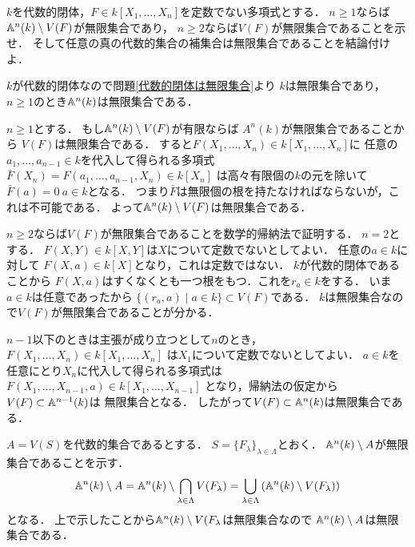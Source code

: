 \begin{prob}
  $k$を代数的閉体，$F\in k[X_1,\dots,X_n]$を定数でない多項式とする．
  $n\ge 1$ならば$\mathbb{A}^n(k) \setminus V(F)$が無限集合であり，
  $n\ge 2$ならば$V(F)$が無限集合であることを示せ．
  そして任意の真の代数的集合の補集合は無限集合であることを結論付けよ．
\end{prob}
\begin{ans}
  $k$が代数的閉体なので問題\ref{代数的閉体は無限集合}より
  $k$は無限集合であり，$n\ge 1$のとき$\mathbb{A}^n(k)$は無限集合である．
  
  $n\ge 1$とする．
  もし$\mathbb{A}^n(k) \setminus V(F)$が有限ならば
  $A^n(k)$が無限集合であることから
  $V(F)$は無限集合である．
  すると$F(X_1,\dots, X_n) \in k[X_1,\dots,X_n]$に
  任意の$a_1,\dots,a_{n-1} \in k$を代入して得られる多項式
  $\bar{F}(X_n) = F(a_1,\dots ,a_{n-1}, X_n) \in k[X_n]$
  は高々有限個の$k$の元を除いて$\bar{F}(a) = 0 \ a\in k$となる．
  つまり$\bar{F}$は無限個の根を持たなければならないが，これは不可能である．
  よって$\mathbb{A}^n(k) \setminus V(F)$は無限集合である．

  $n\ge 2$ならば$V(F)$が無限集合であることを数学的帰納法で証明する．
  $n = 2$とする．
  $F(X,Y) \in k[X,Y]$は$X$について定数でないとしてよい．
  任意の$a \in k$に対して
  $F(X,a) \in k[X]$となり，これは定数ではない．
  $k$が代数的閉体であることから
  $F(X,a)$はすくなくとも一つ根をもつ．これを$r_a \in k$をする．
  いま$a\in k$は任意であったから
  $ \{ (r_a, a) \mid a \in k \} \subset V(F) $である．
  $k$は無限集合なので$V(F)$が無限集合であることが分かる．
  
  $n-1$以下のときは主張が成り立つとして$n$のとき，
  $F(X_1, \dots, X_n) \in k[X_1,\dots,X_n]$
  は$X_1$について定数でないとしてよい．
  $a \in k$を任意にとり$X_n$に代入して得られる多項式は
  $F(X_1, \dots, X_{n-1}, a) \in k[X_1,\dots,X_{n-1}]$
  となり，帰納法の仮定から$V(F) \subset \mathbb{A}^{n-1}(k)$は
  無限集合となる．
  したがって$V(F) \subset \mathbb{A}^n(k)$は無限集合である．

  $A = V(S)$を代数的集合であるとする．
  $S = \{ F_{\lambda} \}_{\lambda\in\Lambda}$とおく．
  $\mathbb{A}^n(k) \setminus A$が無限集合であることを示す．
  \[ \mathbb{A}^n(k) \setminus A
  = \mathbb{A}^n(k) \setminus \bigcap_{\lambda\in\Lambda} V(F_{\lambda})
  = \bigcup_{\lambda\in\Lambda} \left( \mathbb{A}^n(k) \setminus V(F_{\lambda}) \right) \]
  となる．
  上で示したことから$\mathbb{A}^n(k) \setminus V(F_{\lambda}$は無限集合なので
  $ \mathbb{A}^n(k) \setminus A$は無限集合である．
\end{ans}

